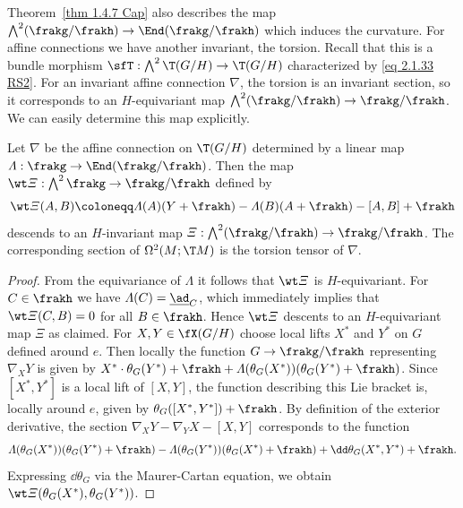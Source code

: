 Theorem~\ref{thm 1.4.7 Cap} also describes the map $\bigwedge\nolimits^2(\frakg\slash\frakh)\to \End(\frakg\slash\frakh)$ which induces the curvature. For affine connections we have another invariant, the torsion. Recall that this is a bundle morphism $\sfT:\bigwedge\nolimits^2 \T(G\slash H)\to \T(G\slash H)$ characterized by \eqref{eq 2.1.33 RS2}. For an invariant affine connection $\nabla$, the torsion is an invariant section, so it corresponds to an $H$-equivariant map $\bigwedge\nolimits^2(\frakg\slash\frakh)\to \frakg\slash\frakh$. We can easily determine this map explicitly.

\begin{prop}\label{prop 1.4.8 Cap}
    Let $\nabla$ be the affine connection on $\T(G\slash H)$ determined by a linear map $\varLambda:\frakg\to\End(\frakg\slash\frakh)$. Then the map $\wt\varXi:\bigwedge\nolimits^2\frakg\to \frakg\slash\frakh$ defined by 
    \[\wt\varXi(A,B)\coloneqq \varLambda(A)(Y+\frakh)-\varLambda(B)(A+\frakh)-[A,B]+\frakh\]
    descends to an $H$-invariant map $\varXi:\bigwedge\nolimits^2(\frakg\slash\frakh)\to \frakg\slash\frakh$. The corresponding section of $\Omega^2(M;\T M)$ is the torsion tensor of $\nabla$.
\end{prop}
\begin{proof}
    From the equivariance of $\varLambda$ it follows that $\wt\varXi$ is $H$-equivariant. For $C\in\frakh$ we have $\varLambda(C)=\underline{\ad}_C$, which immediately implies that $\wt\varXi(C,B)=0$ for all $B\in\frakh$. Hence $\wt\varXi$ descents to an $H$-equivariant map $\varXi$ as claimed. For $X,Y\in\fX(G\slash H)$ choose local lifts $X^\ast$ and $Y^\ast$ on $G$ defined around $e$. Then locally the function $G\to \frakg\slash\frakh$ representing $\nabla_X Y$ is given by $X^\ast\cdot\theta_G(Y^\ast)+\frakh+\varLambda(\theta_G(X^\ast))(\theta_G(Y^\ast)+\frakh)$. Since $[X^\ast,Y^\ast]$ is a local lift of $[X,Y]$, the function describing this Lie bracket is, locally around $e$, given by $\theta_G([X^\ast,Y^\ast])+\frakh$. By definition of the exterior derivative, the section $\nabla_X Y-\nabla_Y X-[X,Y]$ corresponds to the function 
    \[\varLambda(\theta_G(X^\ast))(\theta_G(Y^\ast)+\frakh)-\varLambda(\theta_G(Y^\ast))(\theta_G(X^\ast)+\frakh)+\dd\theta_G(X^\ast,Y^\ast)+\frakh.\]
    Expressing $\dd\theta_G$ via the Maurer-Cartan equation, we obtain $\wt\varXi(\theta_G(X^\ast),\theta_G(Y^\ast))$.
\end{proof}

